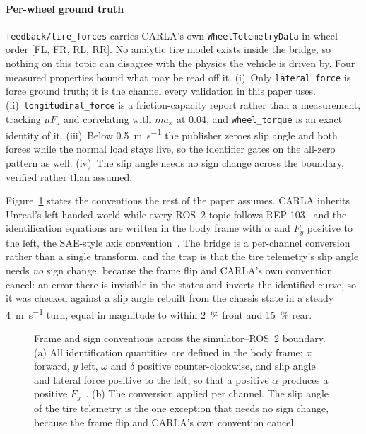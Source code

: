 \paragraph{Per-wheel ground truth}
\texttt{feedback/\allowbreak tire\_forces} carries CARLA's own
\texttt{Wheel\-TelemetryData} in wheel order [FL, FR, RL, RR]. No analytic tire
model exists inside the bridge, so nothing on this topic can disagree with the
physics the vehicle is driven by. Four measured properties bound what may be
read off it. (i)~Only \texttt{lateral\_force} is force ground truth; it is the
channel every validation in this paper uses.
(ii)~\texttt{longitudinal\_force} is a friction-capacity report rather than a
measurement, tracking $\mu F_{z}$ and correlating with $ma_{x}$ at \num{0.04},
and \texttt{wheel\_torque} is an exact identity of it. (iii)~Below
\SI{0.5}{\meter\per\second} the publisher zeroes slip angle and both forces
while the normal load stays live, so the identifier gates on the all-zero
pattern as well. (iv)~The slip angle needs no sign change across the boundary,
verified rather than assumed.

Figure~\ref{fig:frames} states the conventions the rest of the paper assumes.
CARLA inherits Unreal's left-handed world while every ROS~2 topic follows
REP-103~\cite{rep103} and the identification equations are written in the body
frame with $\alpha$ and $F_{y}$ positive to the left, the SAE-style axis
convention~\cite{saej670,pacejka2012book}. The bridge is a per-channel
conversion rather than a single transform, and the trap is that the tire
telemetry's slip angle needs \emph{no} sign change, because the frame flip and
CARLA's own convention cancel: an error there is invisible in the states and
inverts the identified curve, so it was checked against a slip angle rebuilt
from the chassis state in a steady \SI{4}{\meter\per\second} turn, equal in
magnitude to within \SI{2}{\percent} front and \SI{15}{\percent} rear.

\begin{figure}[t]
\centering
\resizebox{\textwidth}{!}{}
\caption{Frame and sign conventions across the simulator--ROS~2 boundary.
(a) All identification quantities are defined in the body frame:
$x$ forward, $y$ left, $\omega$ and $\delta$ positive counter-clockwise, and
slip angle and lateral force positive to the left, so that a positive $\alpha$
produces a positive $F_{y}$~\cite{saej670}. (b) The conversion applied per
channel. The slip angle of the tire telemetry is the one exception that needs
no sign change, because the frame flip and CARLA's own convention cancel.}
\label{fig:frames}
\end{figure}

